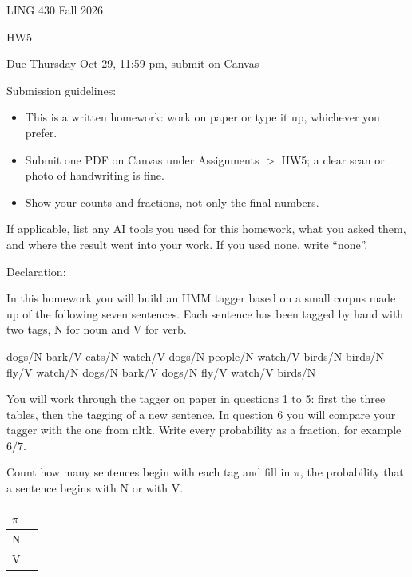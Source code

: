 \documentclass[11pt,letterpaper]{article}
\newcommand{\question}[1]{\needspace{5cm}\vspace{10pt}{\large\bfseries #1}\par\vspace{2pt}}
\begin{document}
LING 430 Fall 2026

HW5

Due Thursday Oct 29, 11:59 pm, submit on Canvas

Submission guidelines:
\begin{itemize}[nosep,leftmargin=1.5em]
  \item This is a written homework: work on paper or type it up, whichever you prefer.
  \item Submit one PDF on Canvas under Assignments $>$ HW5; a clear scan or photo of handwriting is fine.
  \item Show your counts and fractions, not only the final numbers.
\end{itemize}

\question{AI usage}

If applicable, list any AI tools you used for this homework, what you asked them, and where the result went into your work. If you used none, write ``none''.

 Declaration:\vspace{1cm}

\question{An HMM tagger from a small corpus}

In this homework you will build an HMM tagger based on a small corpus made up of the following seven sentences. Each sentence has been tagged by hand with two tags, N for noun and V for verb.

\begin{code}
dogs/N bark/V
cats/N watch/V dogs/N
people/N watch/V birds/N
birds/N fly/V
watch/N dogs/N bark/V
dogs/N fly/V
watch/V birds/N
\end{code}

You will work through the tagger on paper in questions 1 to 5: first the three tables, then the tagging of a new sentence. In question 6 you will compare your tagger with the one from nltk. Write every probability as a fraction, for example $6/7$.

\question{1. The start table $\pi$}

Count how many sentences begin with each tag and fill in $\pi$, the probability that a sentence begins with N or with V.

\begin{tabular}{|l|>{\centering\arraybackslash}p{2.2cm}|}
\hline
$\pi$ & \\ \hline
N &  \\ \hline
V &  \\ \hline
\end{tabular}
\end{document}
